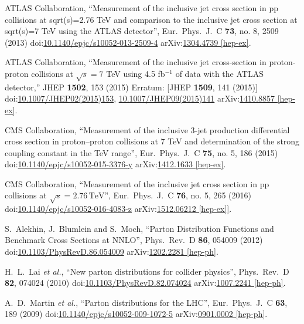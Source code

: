 \begin{thebibliography}{99}
ATLAS Collaboration, ``Measurement of the inclusive jet cross section in pp collisions at sqrt(s)=2.76 TeV and comparison to the inclusive jet cross section at sqrt(s)=7 TeV using the ATLAS detector'', Eur.\ Phys.\ J.\ C {\bf 73}, no. 8, 2509 (2013) doi:\href{http://dx.doi.org/10.1140/epjc/s10052-013-2509-4}{10.1140/epjc/s10052-013-2509-4} arXiv:\href{https://arxiv.org/abs/1304.4739}{1304.4739 [hep-ex]}.
 
ATLAS Collaboration, ``Measurement of the inclusive jet cross-section in proton-proton collisions at $ \sqrt{s}=7 $ TeV using 4.5 fb$^{-1}$ of data with the ATLAS detector,'' JHEP {\bf 1502}, 153 (2015) Erratum: [JHEP {\bf 1509}, 141 (2015)] doi:\href{http://dx.doi.org/10.1007/JHEP02(2015)153}{10.1007/JHEP02(2015)153}, \href{http://dx.doi.org/10.1007/JHEP09(2015)141}{10.1007/JHEP09(2015)141} arXiv:\href{https://arxiv.org/abs/1410.8857}{1410.8857 [hep-ex]}.

CMS Collaboration, ``Measurement of the inclusive 3-jet production differential cross section in proton–proton collisions at 7 TeV and determination of the strong coupling constant in the TeV range'', Eur.\ Phys.\ J.\ C {\bf 75}, no. 5, 186 (2015) doi:\href{http://dx.doi.org/10.1140/epjc/s10052-015-3376-y}{10.1140/epjc/s10052-015-3376-y} arXiv:\href{https://arxiv.org/abs/1412.1633}{1412.1633 [hep-ex]}.

CMS Collaboration, ``Measurement of the inclusive jet cross section in pp collisions at $\sqrt{s} = 2.76\,\text {TeV}$'', Eur.\ Phys.\ J.\ C {\bf 76}, no. 5, 265 (2016) doi:\href{http://dx.doi.org/10.1140/epjc/s10052-016-4083-z}{10.1140/epjc/s10052-016-4083-z} arXiv:\href{https://arxiv.org/abs/1512.06212}{1512.06212 [hep-ex]]}.

S.~Alekhin, J.~Blumlein and S.~Moch, ``Parton Distribution Functions and Benchmark Cross Sections at NNLO'', Phys.\ Rev.\ D {\bf 86}, 054009 (2012) doi:\href{http://dx.doi.org/10.1103/PhysRevD.86.054009}{10.1103/PhysRevD.86.054009} arXiv:\href{https://arxiv.org/abs/1202.2281}{1202.2281 [hep-ph]}.

  H.~L.~Lai {\it et al.}, ``New parton distributions for collider physics'', Phys.\ Rev.\ D {\bf 82}, 074024 (2010) doi:\href{http://dx.doi.org/10.1103/PhysRevD.82.074024}{10.1103/PhysRevD.82.074024} arXiv:\href{https://arxiv.org/abs/1007.2241}{1007.2241 [hep-ph]}.
  
A.~D.~Martin {\it et al.}, ``Parton distributions for the LHC'', Eur.\ Phys.\ J.\ C {\bf 63}, 189 (2009) doi:\href{http://dx.doi.org/10.1140/epjc/s10052-009-1072-5}{10.1140/epjc/s10052-009-1072-5} arXiv:\href{https://arxiv.org/abs/0901.0002}{0901.0002 [hep-ph]}.


\end{thebibliography}
